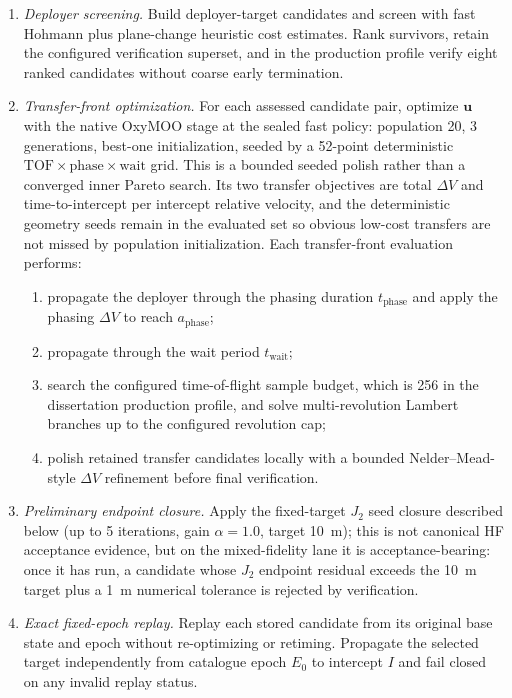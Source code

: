    \begin{enumerate}[leftmargin=*]
        \item \emph{Deployer screening.} Build deployer-target candidates and screen with fast Hohmann plus plane-change heuristic cost estimates. Rank survivors, retain the configured verification superset, and in the production profile verify eight ranked candidates without coarse early termination.
        \item \emph{Transfer-front optimization.} For each assessed candidate pair, optimize \(\mathbf{u}\) with the native OxyMOO  stage at the sealed fast policy: population \num{20}, \num{3} generations, best-one initialization, seeded by a \num{52}-point deterministic \(\text{TOF}\times\text{phase}\times\text{wait}\) grid. This is a bounded seeded polish rather than a converged inner Pareto search. Its two transfer objectives are total \(\Delta V\) and time-to-intercept per intercept relative velocity, and the deterministic geometry seeds remain in the evaluated set so obvious low-cost transfers are not missed by population initialization. Each transfer-front evaluation performs:
        \begin{enumerate}
            \item propagate the deployer through the phasing duration \(t_{\mathrm{phase}}\) and apply the phasing \(\Delta V\) to reach \(a_{\mathrm{phase}}\);
            \item propagate through the wait period \(t_{\mathrm{wait}}\);
            \item search the configured time-of-flight sample budget, which is \num{256} in the dissertation production profile, and solve multi-revolution Lambert branches up to the configured revolution cap;
            \item polish retained transfer candidates locally with a bounded Nelder--Mead-style \(\Delta V\) refinement before final verification.
        \end{enumerate}
        \item \emph{Preliminary endpoint closure.} Apply the fixed-target \(J_2\) seed closure described below (up to 5 iterations, gain \(\alpha=1.0\), target \SI{10}{\metre}); this is not canonical HF acceptance evidence, but on the mixed-fidelity lane it is acceptance-bearing: once it has run, a candidate whose \(J_2\) endpoint residual exceeds the \SI{10}{\metre} target plus a \SI{1}{\metre} numerical tolerance is rejected by verification.
        \item \emph{Exact fixed-epoch replay.} Replay each stored candidate from its original base state and epoch without re-optimizing or retiming. Propagate the selected target independently from catalogue epoch \(E_0\) to intercept \(I\) and fail closed on any invalid replay status.

\end{enumerate}
